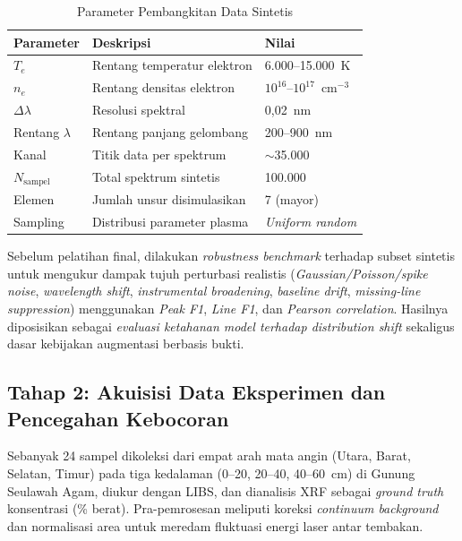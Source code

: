 \begin{table}[htbp]
  \centering
  \caption{Parameter Pembangkitan Data Sintetis}
  \label{tab:ai_param_sintetis}
  \small
  \begin{tabular}{|l|l|l|}
    \hline
    \textbf{Parameter} & \textbf{Deskripsi} & \textbf{Nilai} \\
    \hline
    $T_e$ & Rentang temperatur elektron & 6.000--15.000~K \\ \hline
    $n_e$ & Rentang densitas elektron & $10^{16}$--$10^{17}$~cm$^{-3}$ \\ \hline
    $\Delta\lambda$ & Resolusi spektral & 0,02~nm \\ \hline
    Rentang $\lambda$ & Rentang panjang gelombang & 200--900~nm \\ \hline
    Kanal & Titik data per spektrum & $\sim$35.000 \\ \hline
    $N_{\text{sampel}}$ & Total spektrum sintetis & 100.000 \\ \hline
    Elemen & Jumlah unsur disimulasikan & 7 (mayor) \\ \hline
    Sampling & Distribusi parameter plasma & \textit{Uniform random} \\ \hline
  \end{tabular}
\end{table}

Sebelum pelatihan final, dilakukan \textit{robustness benchmark} terhadap subset sintetis untuk mengukur dampak tujuh perturbasi realistis (\textit{Gaussian/Poisson/spike noise}, \textit{wavelength shift}, \textit{instrumental broadening}, \textit{baseline drift}, \textit{missing-line suppression}) menggunakan \textit{Peak F1}, \textit{Line F1}, dan \textit{Pearson correlation}. Hasilnya diposisikan sebagai \emph{evaluasi ketahanan model terhadap \textit{distribution shift}} sekaligus dasar kebijakan augmentasi berbasis bukti.

\subsection{Tahap 2: Akuisisi Data Eksperimen dan Pencegahan Kebocoran}
Sebanyak 24 sampel dikoleksi dari empat arah mata angin (Utara, Barat, Selatan, Timur) pada tiga kedalaman (0--20, 20--40, 40--60~cm) di Gunung Seulawah Agam, diukur dengan LIBS, dan dianalisis XRF sebagai \textit{ground truth} konsentrasi (\% berat). Pra-pemrosesan meliputi koreksi \textit{continuum background} dan normalisasi area untuk meredam fluktuasi energi laser antar tembakan.

